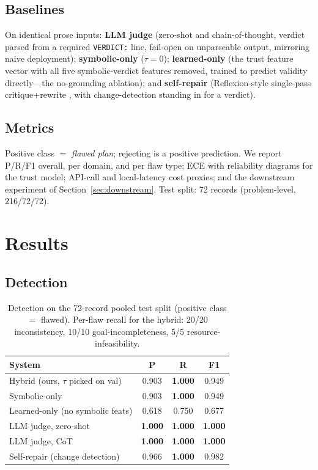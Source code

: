 \documentclass[letterpaper]{article}
\begin{document}
\subsection{Baselines}

On identical prose inputs: \textbf{LLM judge} (zero-shot and
chain-of-thought, verdict parsed from a required \texttt{VERDICT:} line,
fail-open on unparseable output, mirroring naive deployment);
\textbf{symbolic-only} ($\tau{=}0$); \textbf{learned-only} (the trust
feature vector with all five symbolic-verdict features removed, trained to
predict validity directly---the no-grounding ablation); and
\textbf{self-repair} (Reflexion-style single-pass critique$+$rewrite
\citep{shinn2023reflexion}, with change-detection standing in for a verdict).

\subsection{Metrics}

Positive class $=$ \emph{flawed plan}; rejecting is a positive prediction.
We report P/R/F1 overall, per domain, and per flaw type; ECE with
reliability diagrams for the trust model; API-call and local-latency cost
proxies; and the downstream experiment of
Section~\ref{sec:downstream}. Test split: 72 records (problem-level,
216/72/72).

\section{Results}

\subsection{Detection}

\begin{table}[t]
\centering
\small
\begin{tabular}{lccc}
\toprule
System & P & R & F1 \\
\midrule
Hybrid (ours, $\tau$ picked on val) & 0.903 & \textbf{1.000} & 0.949 \\
Symbolic-only & 0.903 & \textbf{1.000} & 0.949 \\
Learned-only (no symbolic feats) & 0.618 & 0.750 & 0.677 \\
LLM judge, zero-shot & \textbf{1.000} & \textbf{1.000} & \textbf{1.000} \\
LLM judge, CoT & \textbf{1.000} & \textbf{1.000} & \textbf{1.000} \\
Self-repair (change detection) & 0.966 & \textbf{1.000} & 0.982 \\
\bottomrule
\end{tabular}
\caption{Detection on the 72-record pooled test split (positive class $=$
flawed). Per-flaw recall for the hybrid: 20/20 inconsistency, 10/10
goal-incompleteness, 5/5 resource-infeasibility.}
\label{tab:main}
\end{table}
\end{document}
